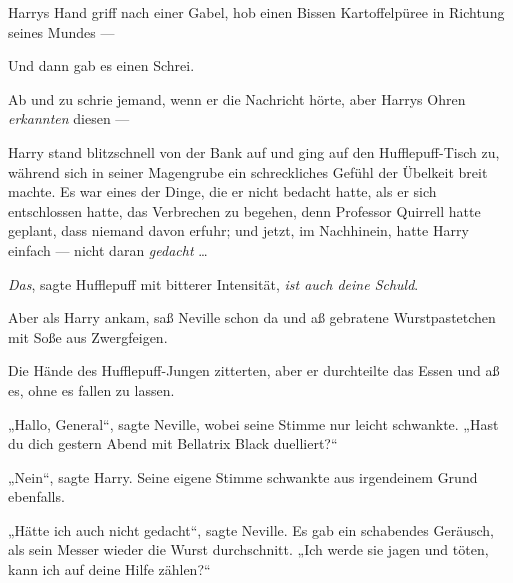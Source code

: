 Harrys Hand griff nach einer Gabel, hob einen Bissen Kartoffelpüree in Richtung seines Mundes —

Und dann gab es einen Schrei.

Ab und zu schrie jemand, wenn er die Nachricht hörte, aber Harrys Ohren \emph{erkannten} diesen —

Harry stand blitzschnell von der Bank auf und ging auf den Hufflepuff-Tisch zu, während sich in seiner Magengrube ein schreckliches Gefühl der Übelkeit breit machte. Es war eines der Dinge, die er nicht bedacht hatte, als er sich entschlossen hatte, das Verbrechen zu begehen, denn Professor Quirrell hatte geplant, dass niemand davon erfuhr; und jetzt, im Nachhinein, hatte Harry einfach — nicht daran \emph{gedacht} …

\emph{Das}, sagte Hufflepuff mit bitterer Intensität, \emph{ist auch deine Schuld}.

Aber als Harry ankam, saß Neville schon da und aß gebratene Wurstpastetchen mit Soße aus Zwergfeigen.

Die Hände des Hufflepuff-Jungen zitterten, aber er durchteilte das Essen und aß es, ohne es fallen zu lassen.

„Hallo, General“, sagte Neville, wobei seine Stimme nur leicht schwankte.
„Hast du dich gestern Abend mit Bellatrix Black duelliert?“

„Nein“, sagte Harry. Seine eigene Stimme schwankte aus irgendeinem Grund ebenfalls.

„Hätte ich auch nicht gedacht“, sagte Neville. Es gab ein schabendes Geräusch, als sein Messer wieder die Wurst durchschnitt.
„Ich werde sie jagen und töten, kann ich auf deine Hilfe zählen?“

